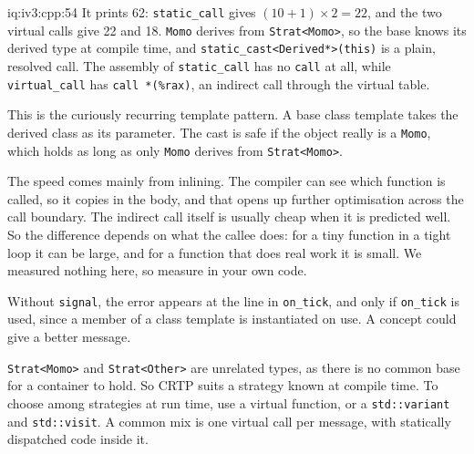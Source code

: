 \begin{solution}{iq:iv3:cpp:54}
It prints 62: \texttt{static\_call} gives $(10 + 1) \times 2 = 22$, and the two virtual calls give 22 and 18. \texttt{Momo} derives from \texttt{Strat<Momo>}, so the base knows its derived type at compile time, and \texttt{static\_cast<Derived*>(this)} is a plain, resolved call. The assembly of \texttt{static\_call} has no \texttt{call} at all, while \texttt{virtual\_call} has \texttt{call *(\%rax)}, an indirect call through the virtual table.

This is the curiously recurring template pattern. A base class template takes the derived class as its parameter. The cast is safe if the object really is a \texttt{Momo}, which holds as long as only \texttt{Momo} derives from \texttt{Strat<Momo>}.

The speed comes mainly from inlining. The compiler can see which function is called, so it copies in the body, and that opens up further optimisation across the call boundary. The indirect call itself is usually cheap when it is predicted well. So the difference depends on what the callee does: for a tiny function in a tight loop it can be large, and for a function that does real work it is small. We measured nothing here, so measure in your own code.

Without \texttt{signal}, the error appears at the line in \texttt{on\_tick}, and only if \texttt{on\_tick} is used, since a member of a class template is instantiated on use. A concept could give a better message.

\texttt{Strat<Momo>} and \texttt{Strat<Other>} are unrelated types, as there is no common base for a container to hold. So CRTP suits a strategy known at compile time. To choose among strategies at run time, use a virtual function, or a \texttt{std::variant} and \texttt{std::visit}. A common mix is one virtual call per message, with statically dispatched code inside it.

\end{solution}

